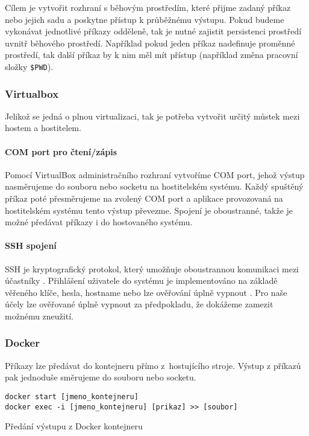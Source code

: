 Cílem je vytvořit rozhraní s běhovým prostředím, které přijme zadaný příkaz nebo jejich sadu a poskytne přístup k průběžnému výstupu.
Pokud budeme vykonávat jednotlivé příkazy odděleně, tak je nutné zajistit persistenci prostředí uvnitř běhového prostředí.
Například pokud jeden příkaz nadefinuje proměnné prostředí, tak další příkaz by k nim měl mít přístup (například změna pracovní složky \verb|$PWD|).

\subsubsection{Virtualbox}

Jelikož se jedná o plnou virtualizaci, tak je potřeba vytvořit určitý můstek mezi hostem a hostitelem.

\paragraph{COM port pro čtení/zápis}

Pomocí VirtualBox administračního rozhraní vytvoříme COM port, jehož výstup nasměrujeme do souboru nebo socketu na hostitelském systému.
Každý spuštěný příkaz poté přesměrujeme na zvolený COM port a aplikace provozovaná na hostitelském systému tento výstup převezme.
Spojení je oboustranné, takže je možné předávat příkazy i do hostovaného systému.
\cite{virtualbox_serial}

\paragraph{SSH spojení}

SSH je kryptografický protokol, který umožňuje oboustrannou komunikaci mezi účastníky \cite{ssh_rfc}.
Přihlášení uživatele do systému je implementováno na základě věřeného klíče, hesla, hostname nebo lze ověřování úplně vypnout \cite{ssh_auth_rfc}.
Pro naše účely lze ověřované úplně vypnout za předpokladu, že dokážeme zamezit možnému zneužití.

\subsubsection{Docker}

Příkazy lze předávat do kontejneru přímo z~hostujícího stroje.
Výstup z příkazů pak jednoduše směrujeme do souboru nebo socketu.

\begin{listing}[ht]
\begin{verbatim}
docker start [jmeno_kontejneru]
docker exec -i [jmeno_kontejneru] [prikaz] >> [soubor]
\end{verbatim}
\caption{Předání výstupu z Docker kontejneru}
\end{listing}

